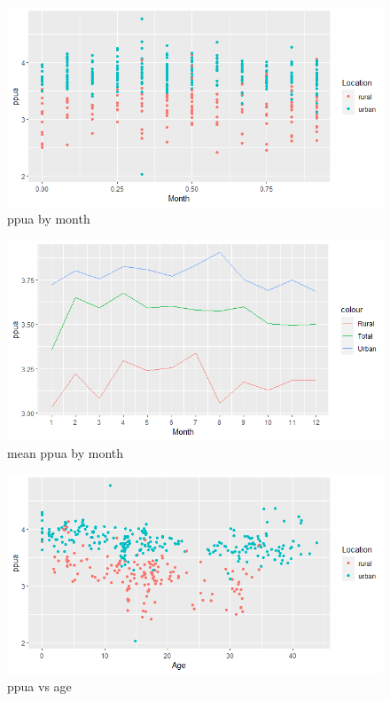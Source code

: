 \begin{figure}[hbt!]
    \centering
    \includegraphics[scale=0.80]{img/seasonal.png}
    \caption{ppua by month}
    \label{fig:seasonal}
\end{figure}

\begin{figure}[hbt!]
    \centering
    \includegraphics[scale=0.80]{img/seasonalmean.png}
    \caption{mean ppua by month}
    \label{fig:seasonalmean}
\end{figure}

\begin{figure}[hbt!]
    \centering
    \includegraphics[scale=0.80]{img/agetogether.png}
    \caption{ppua vs age}
    \label{fig:age}
\end{figure}

